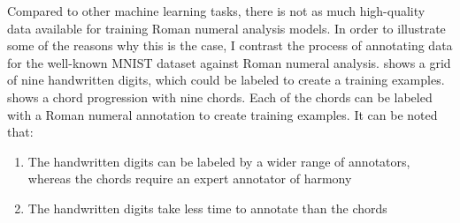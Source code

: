 

Compared to other machine learning tasks, there is not as
much high-quality data available for training Roman numeral
analysis models. In order to illustrate some of the reasons
why this is the case, I contrast the process of annotating
data for the well-known MNIST dataset against Roman numeral
analysis.  shows a grid of nine handwritten
digits, which could be labeled to create a training
examples.  shows a chord progression with
nine chords. Each of the chords can be labeled with a Roman
numeral annotation to create training examples. It can be
noted that:

\begin{enumerate}
    \item The handwritten digits can be labeled by a wider
    range of annotators, whereas the chords require an
    expert annotator of harmony
    \item The handwritten digits take less time to annotate
    than the chords
\end{enumerate}


